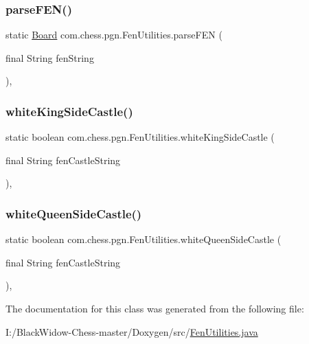 \mbox{\label{classcom_1_1chess_1_1pgn_1_1_fen_utilities_a1a43610bf076ec333ae7ceaf760a4f79}} 
\subsubsection{\texorpdfstring{parseFEN()}{parseFEN()}}
{\footnotesize\ttfamily static \mbox{\hyperlink{classcom_1_1chess_1_1engine_1_1classic_1_1board_1_1_board}{Board}} com.\+chess.\+pgn.\+Fen\+Utilities.\+parse\+F\+EN (\begin{DoxyParamCaption}\item[{final String}]{fen\+String }\end{DoxyParamCaption})\hspace{0.3cm}{\ttfamily [static]}, {\ttfamily [private]}}

\mbox{\label{classcom_1_1chess_1_1pgn_1_1_fen_utilities_aba302a0f866ba7ed6e072979c4c4c724}} 
\subsubsection{\texorpdfstring{whiteKingSideCastle()}{whiteKingSideCastle()}}
{\footnotesize\ttfamily static boolean com.\+chess.\+pgn.\+Fen\+Utilities.\+white\+King\+Side\+Castle (\begin{DoxyParamCaption}\item[{final String}]{fen\+Castle\+String }\end{DoxyParamCaption})\hspace{0.3cm}{\ttfamily [static]}, {\ttfamily [private]}}

\mbox{\label{classcom_1_1chess_1_1pgn_1_1_fen_utilities_ac20a5272906e6654c5a448f727ebf899}} 
\subsubsection{\texorpdfstring{whiteQueenSideCastle()}{whiteQueenSideCastle()}}
{\footnotesize\ttfamily static boolean com.\+chess.\+pgn.\+Fen\+Utilities.\+white\+Queen\+Side\+Castle (\begin{DoxyParamCaption}\item[{final String}]{fen\+Castle\+String }\end{DoxyParamCaption})\hspace{0.3cm}{\ttfamily [static]}, {\ttfamily [private]}}



The documentation for this class was generated from the following file\+:\begin{DoxyCompactItemize}
\item 
I\+:/\+Black\+Widow-\/\+Chess-\/master/\+Doxygen/src/\mbox{\hyperlink{_fen_utilities_8java}{Fen\+Utilities.\+java}}\end{DoxyCompactItemize}
